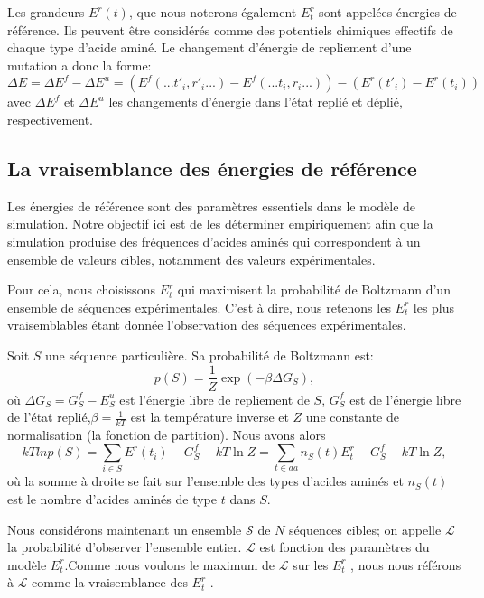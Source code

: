 Les grandeurs $E^r(t)$, que nous noterons également $E_t^r$ sont appelées \og énergies de référence\fg. Ils peuvent être considérés comme des potentiels chimiques effectifs de chaque type d'acide aminé. Le changement d'énergie de repliement d'une mutation a donc la forme:
\begin{equation} \label{eq:deltaE}
  \Delta E=\Delta E^f - \Delta E^u=(E^f(...t'_i,r'_i...) - E^f(...t_i,r_i...)) -(E^r(t'_i) - E^r(t_i))
\end{equation} 
avec $\Delta E^f$ et  $\Delta E^u$ les changements d'énergie dans l'état replié et déplié, respectivement.

\subsection{La vraisemblance des énergies de référence}
Les énergies de référence sont des paramètres essentiels dans le modèle de simulation. Notre objectif ici
est de les déterminer empiriquement afin que la simulation produise des fréquences d'acides aminés
qui correspondent à un ensemble de valeurs cibles, notamment des valeurs expérimentales.

Pour cela, nous choisissons $E_t^r$ qui maximisent la probabilité de Boltzmann d'un ensemble de séquences expérimentales.
C'est à dire, nous retenons les $E_t^r$ les plus vraisemblables étant donnée l'observation des séquences expérimentales.

Soit $S$ une séquence particulière. Sa probabilité de Boltzmann est:
\begin{equation}
  p(S)=\frac{1}{Z}\exp(-\beta \Delta G_S),
\end{equation}
où $\Delta G_S=G_S^f - E^u_S $ est l'énergie libre de repliement de $S$, $G^f_S$ est de l'énergie libre de l'état replié,$\beta =\frac{1}{kT}$ est la température inverse et $Z$ une constante de normalisation (la fonction de partition). Nous avons alors
\begin{equation}
kTln p(S) = \sum_{i\in S} E^r(t_i) - G^f_S - kT \ln Z = \sum_{t\in aa}n_S(t)E^r_t - G^f_S - kT\ln Z,
\end{equation}
où la somme à droite se fait sur l'ensemble des types d'acides aminés et $n_S(t)$ est le nombre d'acides aminés de type $t$ dans $S$.

Nous considérons maintenant un ensemble $\mathcal{S}$ de $N$ séquences cibles; on appelle $\mathcal{L}$ la probabilité d'observer l'ensemble entier. $\mathcal{L}$ est fonction des paramètres du modèle $E_t^r$.Comme nous voulons le maximum de $\mathcal{L}$ sur les $E_t^r$ , nous nous référons  à  $\mathcal{L}$ comme la vraisemblance des $E_t^r$ \cite{Kleinman06}.

